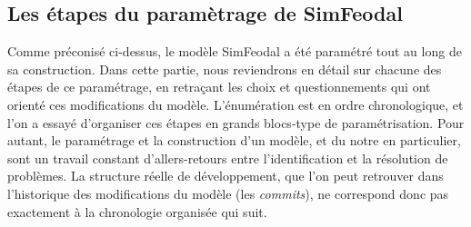 \subsection{Les étapes du paramètrage de SimFeodal}
	
Comme préconisé ci-dessus, le modèle SimFeodal a été paramétré tout au long de sa construction. Dans cette partie, nous reviendrons en détail sur chacune des étapes de ce paramétrage, en retraçant les choix et questionnements qui ont orienté ces modifications du modèle. L'énumération est en ordre chronologique, et l'on a essayé d'organiser ces étapes en grands blocs-type de paramétrisation. Pour autant, le paramétrage et la construction d'un modèle, et du notre en particulier, sont un travail constant d'allers-retours entre l'identification et la résolution de problèmes. La structure réelle de développement, que l'on peut retrouver dans l'historique des modifications du modèle (les \og \textit{commits}\fg{}), ne correspond donc pas exactement à la chronologie organisée qui suit.
	
